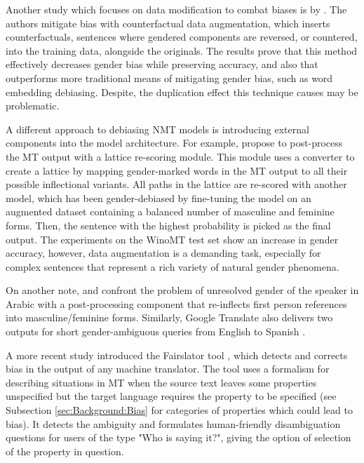 Another study which focuses on data modification to combat biases is by \citet{lu2020gender}. The authors mitigate bias with counterfactual data augmentation,  which inserts counterfactuals, sentences where gendered components are reversed, or countered, into the training data, alongside the originals. The results prove that this method effectively decreases gender bias while preserving accuracy, and also that outperforms more traditional means of mitigating gender bias, such as word embedding debiasing. Despite, the duplication effect this technique causes may be problematic.

A different approach to debiasing NMT models is introducing external components into the model architecture. For example, \citet{Saunders_2020} propose to post-process the MT output with a lattice re-scoring module. This module uses a converter to create a lattice by mapping gender-marked words in the MT output to all their possible inflectional variants. All paths in the lattice are re-scored with another model, which has been gender-debiased by fine-tuning the model on an augmented dataset containing a balanced number of masculine and feminine forms. Then, the sentence with the highest probability is picked as the final output. The experiments on the WinoMT test set show an increase in gender accuracy, however, data augmentation is a demanding task, especially for complex sentences that represent a rich variety of natural gender phenomena. 

On another note, \citet{Habash_2019} and \citet{alhafni2020gender} confront the problem of unresolved gender of the speaker in Arabic with a post-processing component that re-inflects first person references into masculine/feminine forms. Similarly, Google Translate also delivers two outputs for short gender-ambiguous queries from English to Spanish \parencite{johnson2020scalable}.

A more recent study introduced the Fairslator tool \parencite{bias_taxonomy}, which detects and corrects bias in the output of any machine translator. The tool uses a formalism for describing situations in MT when the source text leaves some properties unspecified but the target language requires the property to be specified (see Subsection \ref{sec:Background:Bias} for categories of properties which could lead to bias). It detects the ambiguity and formulates human-friendly disambiguation questions for users of the type "Who is saying it?", giving the option of selection of the property in question.


